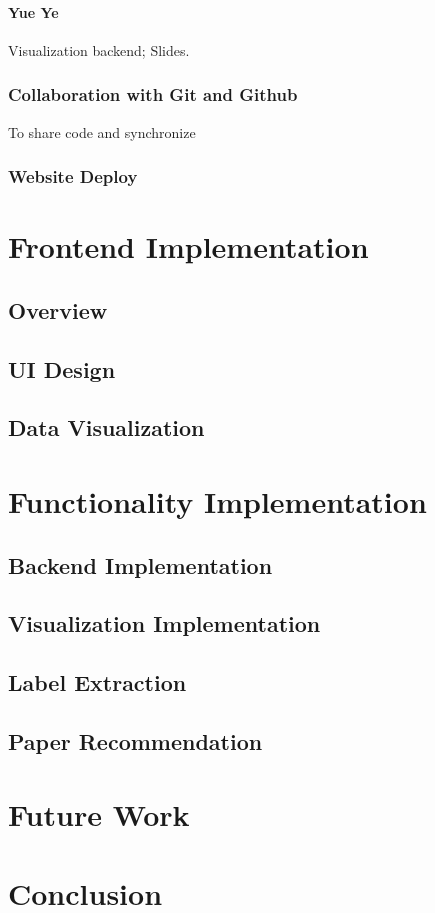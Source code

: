 \documentclass[a4paper, 10pt]{article}
\begin{document}
\paragraph{Yue Ye} Visualization backend; Slides.
\subsubsection{Collaboration with Git and Github}
To share code and synchronize 
\subsubsection{Website Deploy}
\section{Frontend Implementation}
\subsection{Overview}
\subsection{UI Design}
\subsection{Data Visualization}
\section{Functionality Implementation}
\subsection{Backend Implementation}
\subsection{Visualization Implementation}
\subsection{Label Extraction}
\subsection{Paper Recommendation}
\section{Future Work}
\section{Conclusion}

\newpage
\begin{appendices}
\end{appendices}
\end{document}
